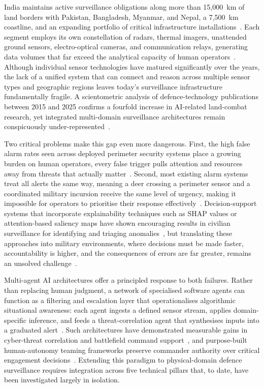 India maintains active surveillance obligations along more than 15{,}000~km of land borders with Pakistan, Bangladesh, Myanmar, and Nepal, a 7{,}500~km coastline, and an expanding portfolio of critical infrastructure installations~\cite{indiaai2024springer}. Each segment employs its own constellation of radars, thermal imagers, unattended ground sensors, electro-optical cameras, and communication relays, generating data volumes that far exceed the analytical capacity of human operators~\cite{meng2023multisource}. Although individual sensor technologies have matured significantly over the years, the lack of a unified system that can connect and reason across multiple sensor types and geographic regions leaves today's surveillance infrastructure fundamentally fragile. A scientometric analysis of defence-technology publications between 2015 and 2025 confirms a fourfold increase in AI-related land-combat research, yet integrated multi-domain surveillance architectures remain conspicuously under-represented~\cite{emerging2025scientometric}.

Two critical problems make this gap even more dangerous. First, the high false alarm rates seen across deployed perimeter security systems place a growing burden on human operators, every false trigger pulls attention and resources away from threats that actually matter~\cite{deepsurvey2023anomaly}. Second, most existing alarm systems treat all alerts the same way, meaning a deer crossing a perimeter sensor and a coordinated military incursion receive the same level of urgency, making it impossible for operators to prioritise their response effectively~\cite{cctv2024anomaly}. Decision-support systems that incorporate explainability techniques such as SHAP values or attention-based saliency maps have shown encouraging results in civilian surveillance for identifying and triaging anomalies~\cite{zhang2022xai}, but translating these approaches into military environments, where decisions must be made faster, accountability is higher, and the consequences of errors are far greater, remains an unsolved challenge~\cite{military2024xai}.

Multi-agent AI architectures offer a principled response to both failures. Rather than replacing human judgment, a network of specialised software agents can function as a filtering and escalation layer that operationalises algorithmic situational awareness: each agent ingests a defined sensor stream, applies domain-specific inference, and feeds a threat-correlation agent that synthesises inputs into a graduated alert~\cite{hassan2025multiagent, agenticcyber2025}. Such architectures have demonstrated measurable gains in cyber-threat correlation and battlefield command support~\cite{zhao2022deepai}, and purpose-built human-autonomy teaming frameworks preserve commander authority over critical engagement decisions~\cite{autonomyteaming2024, meaningful2024hitl}. Extending this paradigm to physical-domain defence surveillance requires integration across five technical pillars that, to date, have been investigated largely in isolation.

